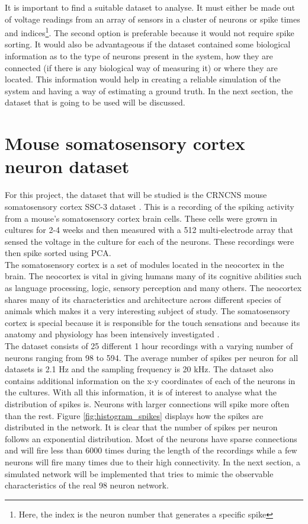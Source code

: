It is important to find a suitable dataset to analyse. It must either be made out of voltage readings from an array of sensors in a cluster of neurons or spike times and indices\footnote{Here, the index is the neuron number that generates a specific spike}. The second option is preferable because it would not require spike sorting. It would also be advantageous if the dataset contained some biological information as to the type of neurons present in the system, how they are connected (if there is any biological way of measuring it) or where they are located. This information would help in creating a reliable simulation of the system and having a way of estimating a ground truth. In the next section, the dataset that is going to be used will be discussed. 

\section{Mouse somatosensory cortex neuron dataset}\label{sec:mouse_dataset}

For this project, the dataset that will be studied is the CRNCNS mouse somatosensory cortex SSC-3 dataset \cite{ito2016spontaneous, ito2014large, litke2004does}. This is a recording of the spiking activity from a mouse's somatosensory cortex brain cells. These cells were grown in cultures for 2-4 weeks and then measured with a 512 multi-electrode array that sensed the voltage in the culture for each of the neurons. These recordings were then spike sorted using PCA. \\

The somatosensory cortex is a set of modules located in the neocortex in the brain. The neocortex is vital in giving humans many of its cognitive abilities such as language processing, logic, sensory perception and many others. The neocortex shares many of its characteristics and architecture across different species of animals which makes it a very interesting subject of study. The somatosensory cortex is special because it is responsible for the touch sensations and because its anatomy and physiology has been intensively investigated \cite{markram2015reconstruction}.\\

The dataset consists of 25 different 1 hour recordings with a varying number of neurons ranging from 98 to 594. The average number of spikes per neuron for all datasets is 2.1 Hz and the sampling frequency is 20 kHz. The dataset also contains additional information on the x-y coordinates of each of the neurons in the cultures. With all this information, it is of interest to analyse what the distribution of spikes is. Neurons with larger connections will spike more often than the rest. Figure \ref{fig:histogram_spikes} displays how the spikes are distributed in the network. It is clear that the number of spikes per neuron follows an exponential distribution. Most of the neurons have sparse connections and will fire less than 6000 times during the length of the recordings while a few neurons will fire many times due to their high connectivity. In the next section, a simulated network will be implemented that tries to mimic the observable characteristics of the real 98 neuron network.\\

